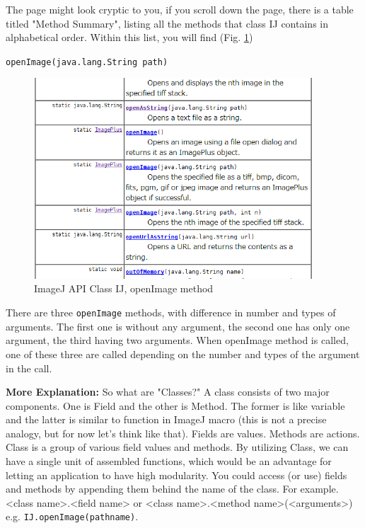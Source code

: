 \documentclass[11pt,a4paper,oneside]{report}
\newcommand{\ilcom}[1]{\texttt{\small#1}}
\begin{document}
The page might look cryptic to you, if you scroll down the page, there is a table titled "Method Summary", listing all the methods that class IJ contains in alphabetical order. 
Within this list, you will find (Fig. \ref{fig:IJAPIIJopenImage})

\ilcom{openImage(java.lang.String path)} 


\begin{figure}[htbp]
\begin{center}
\includegraphics[height=75mm]{fig2/IJAPI_IJopenImage.png}
\caption{ImageJ API Class IJ, openImage method}
\label{fig:IJAPIIJopenImage}
\end{center}
\end{figure}

There are three \ilcom{openImage} methods, with difference in number and types of arguments. 
The first one is without any argument, the second one has only one argument, 
the third having two arguments. 
When openImage method is called, one of these three are called depending on the number 
and types of the argument in the call. 

\textbf{More Explanation:} So what are "Classes?" A class consists of two major components. 
One is Field and the other is Method. 
The former is like variable and the latter is similar to function in ImageJ macro 
(this is not a precise analogy, but for now let's think like that). 
Fields are values. Methods are actions. Class is a group of various field values and methods. 
By utilizing Class, we can have a single unit of assembled functions, 
which would be an advantage for letting an application to have high modularity. 
You could access (or use) fields and methods by appending them behind the name
of the class. For example. <class name>.<field name> or <class name>.<method name>(<arguments>) 
e.g. \ilcom{IJ.openImage(pathname)}.
\end{document}
